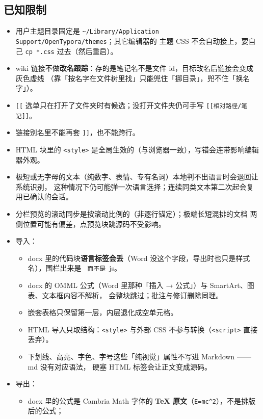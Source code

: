 \documentclass[11pt,a4paper]{ctexart}
\begin{document}
\subsection{已知限制}

\begin{itemize}
\item 用户主题目录固定是 \texttt{\textasciitilde{}/Library/Application Support/OpenTypora/themes}；其它编辑器的
主题 CSS 不会自动接上，要自己 \texttt{cp *.css} 过去（然后重启）。
\item wiki 链接不做\textbf{改名跟踪}：存的是笔记名不是文件 id，目标改名后链接会变成灰色虚线
（靠「按名字在文件树里找」只能兜住「挪目录」，兜不住「换名字」）。
\item \texttt{[[} 选单只在打开了文件夹时有候选；没打开文件夹仍可手写 \texttt{[[相对路径/笔记]]}。
\item 链接别名里不能再套 \texttt{]]}，也不能跨行。
\item HTML 块里的 \texttt{\textless{}style\textgreater{}} 是全局生效的（与浏览器一致），写错会连带影响编辑器外观。
\item 极短或无字母的文本（纯数字、表情、专有名词）本地判不出语言时会退回让系统识别，
这种情况下仍可能弹一次语言选择；连续同类文本第二次起会复用已确认的会话。
\item 分栏预览的滚动同步是按滚动比例的（非逐行锚定）；极端长短混排的文档
两侧位置可能有偏差，点预览块跳源码不受影响。
\item 导入：
\begin{itemize}
\item docx 里的代码块\textbf{语言标签会丢}（Word 没这个字段，导出时也只是样式名），围栏出来是 \texttt{
而不是 }js。
\item docx 的 OMML 公式（Word 里那种「插入 → 公式」）与 SmartArt、图表、文本框内容不解析，
会整块跳过；批注与修订删除同理。
\item 嵌套表格只保留第一层，内层退化成空单元格。
\item HTML 导入只取结构：\texttt{\textless{}style\textgreater{}} 与外部 CSS 不参与转换（\texttt{\textless{}script\textgreater{}} 直接丢弃）。
\item 下划线、高亮、字色、字号这些「纯视觉」属性不写进 Markdown —— md 没有对应语法，
硬塞 HTML 标签会让正文变成源码。
\end{itemize}
\item 导出：
\begin{itemize}
\item docx 里的公式是 Cambria Math 字体的 \textbf{TeX 原文}（\texttt{E=mc\textasciicircum{}2}），不是排版后的公式；

\end{itemize}
\end{itemize}
\end{document}
